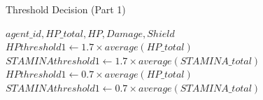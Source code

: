 \begin{algorithm}
\caption{Threshold Decision (Part 1)}\label{alg:11}
\begin{algorithmic} 
\scriptsize
\Require $agent\_id, HP\_total, HP, Damage, Shield$
\State $HPthreshold1 \leftarrow 1.7 \times average(HP\_total)$
\EndIf
{}
\State $STAMINAthreshold1 \leftarrow 1.7 \times average(STAMINA\_total)$
\EndIf
{}
\State $HPthreshold1 \leftarrow 0.7 \times average(HP\_total)$
\EndIf
{}
\State $STAMINAthreshold1 \leftarrow 0.7 \times average(STAMINA\_total)$
\EndIf
\end{algorithmic}
\end{algorithm}



